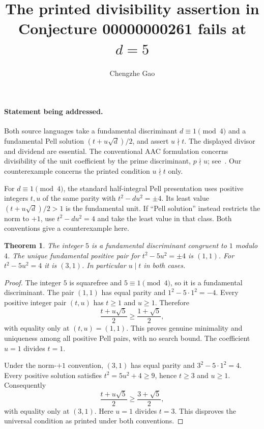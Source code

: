 \documentclass[11pt]{article}
\newtheorem{theorem}{Theorem}
\begin{document}
\title{The printed divisibility assertion in Conjecture 00000000261 fails at $d=5$}
\author{Chengzhe Gao}\date{}\maketitle

\paragraph{Statement being addressed.}
Both source languages take a fundamental discriminant $d\equiv1\pmod4$
and a fundamental Pell solution $(t+u\sqrt d)/2$, and assert
$u\nmid t$. The displayed divisor and dividend are essential.
The conventional AAC formulation concerns divisibility of the unit
coefficient by the prime discriminant, $p\nmid u$; see~\cite{FM}.
Our counterexample concerns the printed condition $u\nmid t$ only.

For $d\equiv1\pmod4$, the standard half-integral Pell presentation
uses positive integers $t,u$ of the same parity with
$t^2-du^2=\pm4$. Its least value $(t+u\sqrt d)/2>1$ is the fundamental
unit. If ``Pell solution'' instead restricts the norm to $+1$,
use $t^2-du^2=4$ and take the least value in that class.
Both conventions give a counterexample here.

\begin{theorem}
The integer $5$ is a fundamental discriminant congruent to $1$ modulo $4$.
The unique fundamental positive pair for $t^2-5u^2=\pm4$ is $(1,1)$.
For $t^2-5u^2=4$ it is $(3,1)$. In particular $u\mid t$ in both cases.
\end{theorem}
\begin{proof}
The integer $5$ is squarefree and $5\equiv1\pmod4$, so it is a
fundamental discriminant. The pair $(1,1)$ has equal parity and
$1^2-5\cdot1^2=-4$. Every positive integer pair $(t,u)$ has $t\geq1$
and $u\geq1$. Therefore
\[
 \frac{t+u\sqrt5}{2}\geq\frac{1+\sqrt5}{2},
\]
with equality only at $(t,u)=(1,1)$. This proves genuine minimality
and uniqueness among all positive Pell pairs, with no search bound.
The coefficient $u=1$ divides $t=1$.

Under the norm-$+1$ convention, $(3,1)$ has equal parity and
$3^2-5\cdot1^2=4$. Every positive solution satisfies
$t^2=5u^2+4\geq9$, hence $t\geq3$ and $u\geq1$. Consequently
\[
 \frac{t+u\sqrt5}{2}\geq\frac{3+\sqrt5}{2},
\]
with equality only at $(3,1)$. Here $u=1$ divides $t=3$.
This disproves the universal condition as printed under both conventions.
\end{proof}
\end{document}
